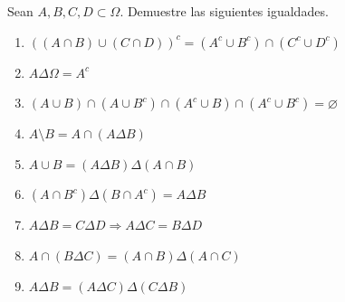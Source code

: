 \documentclass[12pt,a4paper]{article}
\begin{document}
    \begin{mdframed}[style=mdbluebox,frametitle={Ejercicio 2}]
        Sean $A, B, C, D \subset \Omega$. Demuestre las siguientes igualdades.
        \begin{enumerate}[label=(\alph*)]
            \item $((A \cap B) \cup (C \cap D))^c = (A^c \cup B^c) \cap (C^c \cup D^c)$
            \item $A \Delta \Omega = A^c$
            \item $(A \cup B) \cap (A \cup B^c) \cap (A^c \cup B) \cap (A^c \cup B^c) = \varnothing$
            \item $A \setminus B = A \cap (A \Delta B)$
            \item $A \cup B = (A \Delta B) \Delta (A \cap B)$
            \item $(A \cap B^c) \Delta (B \cap A^c) = A \Delta B$
            \item $A \Delta B = C \Delta D \Rightarrow A \Delta C = B \Delta D$
            \item $A \cap (B \Delta C) = (A \cap B) \Delta (A \cap C)$
            \item $A \Delta B = (A \Delta C) \Delta (C \Delta B)$
        \end{enumerate}
    \end{mdframed}
\end{document}
